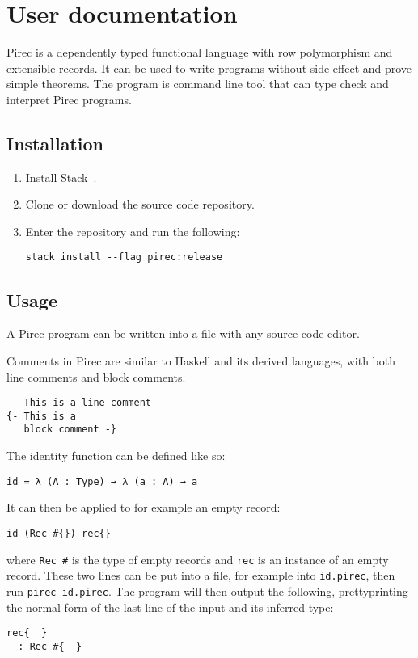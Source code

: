 \chapter{User documentation}\label{ch:userdocs}

Pirec is a dependently typed functional language with row polymorphism and
extensible records. It can be used to write programs without side effect and
prove simple theorems. The program is command line tool that can type check and
interpret Pirec programs.

\section{Installation}\label{sec:install}

\begin{enumerate}
  \item Install Stack~\cite{stack}.
  \item Clone or download the source code repository.
  \item Enter the repository and run the following:
        \begin{verbatim}
stack install --flag pirec:release
        \end{verbatim}
\end{enumerate}

\section{Usage}\label{sec:usage}

A Pirec program can be written into a file with any source code editor.

Comments in Pirec are similar to Haskell and its derived languages, with
both line comments and block comments.
\begin{verbatim}
-- This is a line comment
{- This is a
   block comment -}
\end{verbatim}

The identity function can be defined like so:
\begin{verbatim}
id = λ (A : Type) → λ (a : A) → a
\end{verbatim}
It can then be applied to for example an empty record:
\begin{verbatim}
id (Rec #{}) rec{}
\end{verbatim}
where \texttt{Rec #{}} is the type of empty records
and \texttt{rec{}} is an instance of an empty
record. These two lines can be put into a file, for example into
\texttt{id.pirec}, then run \texttt{pirec id.pirec}. The
program will then output the following, prettyprinting the normal form of the
last line of the input and its inferred type:
\begin{verbatim}
rec{  }
  : Rec #{  }
\end{verbatim}

